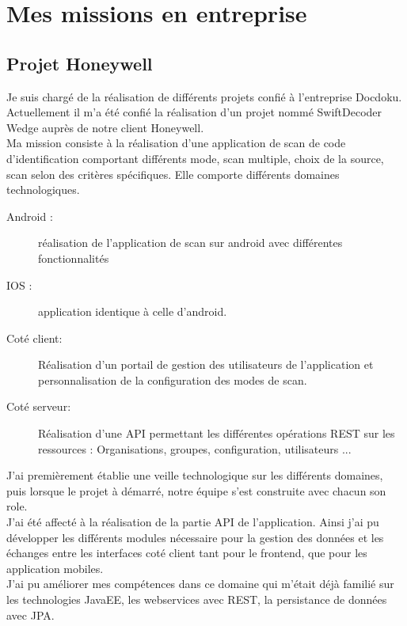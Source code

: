 \documentclass[11pt]{report}
\begin{document}
	\chapter{Mes missions en entreprise}

		\section{Projet Honeywell}

			Je suis chargé de la réalisation de différents projets confié à l'entreprise Docdoku.\\

			Actuellement il m'a été confié la réalisation d'un projet nommé SwiftDecoder Wedge auprès de notre client Honeywell.\\

			Ma mission consiste à la réalisation d'une application de scan de code d'identification comportant différents mode, scan multiple, choix de la source, scan selon des critères spécifiques.
			Elle comporte différents domaines technologiques.

			\begin{description}
				\item[Android :] réalisation de l'application de scan sur android avec différentes fonctionnalités
				\item[IOS :] application identique à celle d'android.
				\item[Coté client:] Réalisation d'un portail de gestion des utilisateurs de l'application et personnalisation de la configuration des modes de scan.
				\item[Coté serveur:] Réalisation d'une API permettant les différentes opérations REST sur les ressources : Organisations, groupes, configuration, utilisateurs ...
			\end{description}

			J'ai premièrement établie une veille technologique sur les différents domaines, puis lorsque le projet à démarré, notre équipe s'est construite avec chacun son role.\\

			J'ai été affecté à la réalisation de la partie API de l'application. Ainsi  j'ai pu développer les différents modules nécessaire pour la gestion des données et les échanges entre les interfaces coté client tant pour le frontend, que pour les application mobiles.\\

			J'ai pu améliorer mes compétences dans ce domaine qui m'était déjà familié sur les technologies JavaEE, les webservices avec REST, la persistance de données avec JPA.
\end{document}
